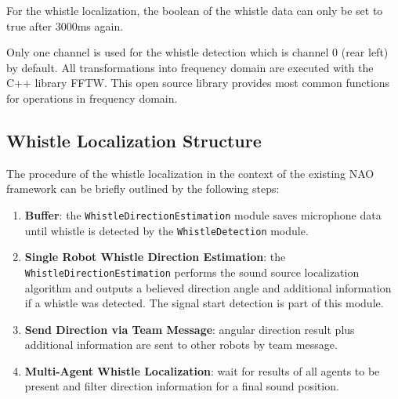 For the whistle localization, the boolean of the whistle data can only be set to true
after 3000\si{\milli\second} again. 

Only one channel is used for the whistle detection which is channel 0
(rear left) by default.
All transformations into frequency domain are executed with the C++ library
\ac{FFTW}.
This open source library provides most common functions for operations
in frequency domain.

\subsection{Whistle Localization Structure}
\label{subsec:03_whistleLocalizationStructure}

The procedure of the whistle localization in the context of the existing
NAO framework can be briefly outlined by the following steps:
\begin{enumerate}
      \item \textbf{Buffer}: the \lstinline!WhistleDirectionEstimation! module saves microphone
            data until whistle is detected by the \lstinline!WhistleDetection! module.
      \item \textbf{Single Robot Whistle Direction Estimation}: the \lstinline!WhistleDirectionEstimation!
            performs the sound source localization algorithm and outputs a
            believed direction angle and additional information if a whistle was detected.
            The signal start detection is part of this module.
      \item \textbf{Send Direction via Team Message}: angular direction result plus additional information
            are sent to other robots by team message.
      \item \textbf{Multi-Agent Whistle Localization}: wait for results of all agents to be present
            and filter direction information for a final sound position.
\end{enumerate}
